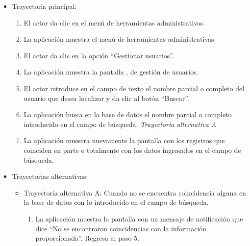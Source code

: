 			\begin{itemize}
				\item Trayectoria principal:
					\begin{enumerate}
						\item El actor da clic en el menú de herramientas administrativas.
						\item La aplicación muestra el menú de herramientas administrativas.
						\item El actor da clic en la opción ``Gestionar usuarios''.
						\item La aplicación muestra la pantalla , de gestión de usuarios.
						\item El actor introduce en el campo de texto el nombre parcial o completo del usuario que desea localizar y da clic al botón ``Buscar''. 
						\item La aplicación busca en la base de datos el nombre parcial o completo introducido en el campo de búsqueda. \textsl{Trayectoria alternativa A}
						\item La aplicación muestra nuevamente la pantalla  con los registros que coinciden en parte o totalmente con los datos ingresados en el campo de búsqueda.
					\end{enumerate}
				\item Trayectorias alternativas:
					\begin{itemize}
						\item Trayectoria alternativa A: Cuando no se encuentra coincidencia alguna en la base de datos con lo introducido en el campo de búsqueda.
							\begin{enumerate}
								\item La aplicación muestra la pantalla  con un mensaje de notificación que dice ``No se encontraron coincidencias con la información proporcionada''. Regresa al paso 5. 
							\end{enumerate}
					\end{itemize}
			\end{itemize}
			
